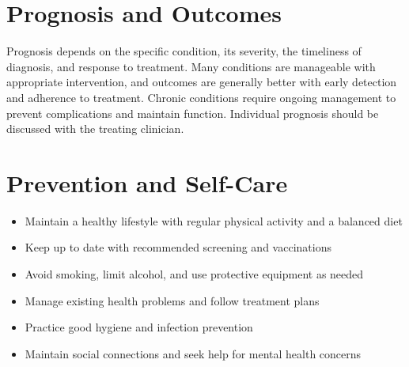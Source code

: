 \section*{Prognosis and Outcomes}
Prognosis depends on the specific condition, its severity, the timeliness of diagnosis, and response to treatment. Many conditions are manageable with appropriate intervention, and outcomes are generally better with early detection and adherence to treatment. Chronic conditions require ongoing management to prevent complications and maintain function. Individual prognosis should be discussed with the treating clinician.

\section*{Prevention and Self-Care}
\begin{itemize}
    \item Maintain a healthy lifestyle with regular physical activity and a balanced diet
    \item Keep up to date with recommended screening and vaccinations
    \item Avoid smoking, limit alcohol, and use protective equipment as needed
    \item Manage existing health problems and follow treatment plans
    \item Practice good hygiene and infection prevention
    \item Maintain social connections and seek help for mental health concerns
\end{itemize}
